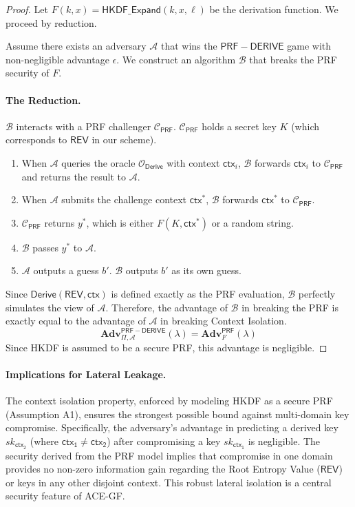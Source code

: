 \documentclass[12pt,a4paper]{article}
\begin{document}
  \begin{proof}
   Let $F(k, x) = \mathsf{HKDF\_Expand}(k, x, \ell)$ be the derivation function. We proceed by reduction.

   Assume there exists an adversary $\mathcal{A}$ that wins the $\mathsf{PRF-DERIVE}$ game with non-negligible advantage $\epsilon$. We construct an algorithm $\mathcal{B}$ that breaks the PRF security of $F$.

   \paragraph{The Reduction.}
   $\mathcal{B}$ interacts with a PRF challenger $\mathcal{C}_{\mathsf{PRF}}$. $\mathcal{C}_{\mathsf{PRF}}$ holds a secret key $K$ (which corresponds to $\mathsf{REV}$ in our scheme).
   \begin{enumerate}
  \item When $\mathcal{A}$ queries the oracle $\mathcal{O}_{\mathsf{Derive}}$ with context $\mathsf{ctx}_i$, $\mathcal{B}$ forwards $\mathsf{ctx}_i$ to $\mathcal{C}_{\mathsf{PRF}}$ and returns the result to $\mathcal{A}$.
  \item When $\mathcal{A}$ submits the challenge context $\mathsf{ctx}^*$, $\mathcal{B}$ forwards $\mathsf{ctx}^*$ to $\mathcal{C}_{\mathsf{PRF}}$.
  \item $\mathcal{C}_{\mathsf{PRF}}$ returns $y^*$, which is either $F(K, \mathsf{ctx}^*)$ or a random string.
  \item $\mathcal{B}$ passes $y^*$ to $\mathcal{A}$.
  \item $\mathcal{A}$ outputs a guess $b'$. $\mathcal{B}$ outputs $b'$ as its own guess.
   \end{enumerate}

   Since $\mathsf{Derive}(\mathsf{REV}, \mathsf{ctx})$ is defined exactly as the PRF evaluation, $\mathcal{B}$ perfectly simulates the view of $\mathcal{A}$. Therefore, the advantage of $\mathcal{B}$ in breaking the PRF is exactly equal to the advantage of $\mathcal{A}$ in breaking Context Isolation.
   \[
  \mathbf{Adv}_{\Pi, \mathcal{A}}^{\mathsf{PRF-DERIVE}}(\lambda) = \mathbf{Adv}_{F}^{\mathsf{PRF}}(\lambda)
   \]
   Since HKDF is assumed to be a secure PRF, this advantage is negligible.
  \end{proof}

  \paragraph{Implications for Lateral Leakage.}
  The context isolation property, enforced by modeling HKDF as a secure PRF (Assumption A1), ensures the strongest possible bound against multi-domain key compromise. Specifically, the adversary's advantage in predicting a derived key $sk_{\mathsf{ctx_2}}$ (where $\mathsf{ctx_1} \neq \mathsf{ctx_2}$) after compromising a key $sk_{\mathsf{ctx_1}}$ is negligible. The security derived from the PRF model implies that compromise in one domain provides no non-zero information gain regarding the Root Entropy Value ($\mathsf{REV}$) or keys in any other disjoint context. This robust lateral isolation is a central security feature of ACE-GF.
\end{document}
